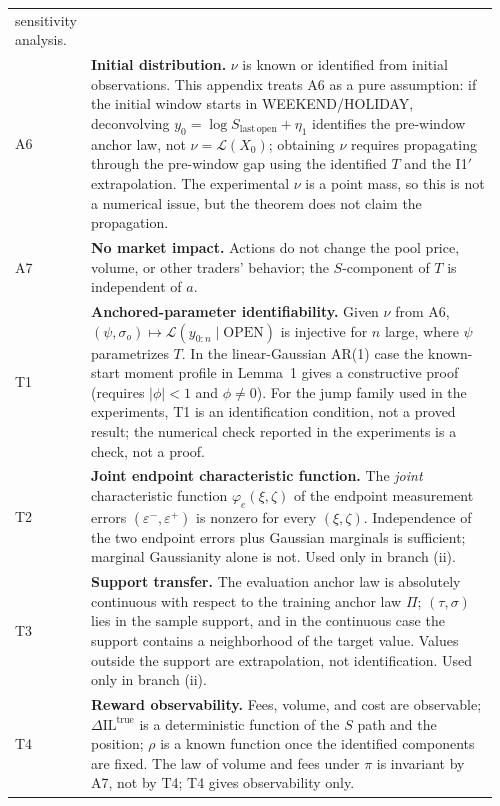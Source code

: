 \begin{longtable}{@{}>{\raggedright\arraybackslash}p{0.07\linewidth}>{\raggedright\arraybackslash}p{0.89\linewidth}@{}}
sensitivity analysis. \\
A6 & \textbf{Initial distribution.} $\nu$ is known or identified from initial
observations.  This appendix treats A6 as a pure assumption: if the initial
window starts in WEEKEND/HOLIDAY, deconvolving
$y_0=\log S_{\mathrm{last\,open}}+\eta_1$ identifies the pre-window anchor law,
not $\nu=\mathcal L(X_0)$; obtaining $\nu$ requires propagating through the
pre-window gap using the identified $T$ and the I1$'$ extrapolation.  The
experimental $\nu$ is a point mass, so this is not a numerical issue, but the
theorem does not claim the propagation. \\
A7 & \textbf{No market impact.} Actions do not change the pool price, volume, or
other traders' behavior; the $S$-component of $T$ is independent of $a$. \\
T1 & \textbf{Anchored-parameter identifiability.} Given $\nu$ from A6,
$(\psi,\sigma_o)\mapsto\mathcal L(y_{0:n}\mid\mathrm{OPEN})$ is injective for
$n$ large, where $\psi$ parametrizes $T$.  In the linear-Gaussian AR(1) case the
known-start moment profile in Lemma~1 gives a constructive proof (requires
$|\phi|<1$ and $\phi\ne0$).  For the jump family used in the experiments, T1 is
an identification condition, not a proved result; the numerical check reported
in the experiments is a check, not a proof. \\
T2 & \textbf{Joint endpoint characteristic function.} The \emph{joint}
characteristic function $\varphi_e(\xi,\zeta)$ of the endpoint measurement
errors $(\varepsilon^-,\varepsilon^+)$ is nonzero for every $(\xi,\zeta)$.
Independence of the two endpoint errors plus Gaussian marginals is sufficient;
marginal Gaussianity alone is not.  Used only in branch (ii). \\
T3 & \textbf{Support transfer.} The evaluation anchor law is absolutely
continuous with respect to the training anchor law $\Pi$; $(\tau,\sigma)$ lies
in the sample support, and in the continuous case the support contains a
neighborhood of the target value.  Values outside the support are extrapolation,
not identification.  Used only in branch (ii). \\
T4 & \textbf{Reward observability.} Fees, volume, and cost are observable;
$\Delta\mathrm{IL}^{\mathrm{true}}$ is a deterministic function of the $S$ path
and the position; $\rho$ is a known function once the identified components are
fixed.  The law of volume and fees under $\pi$ is invariant by A7, not by T4;
T4 gives observability only. \\
\hline
\end{longtable}

